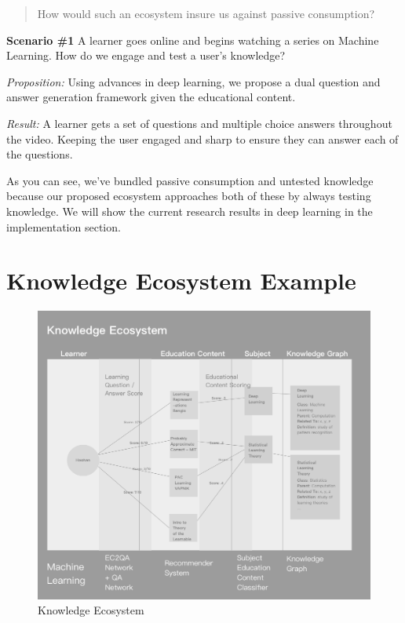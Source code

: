 \documentclass[]{book}
\theoremstyle{definition}
\theoremstyle{definition}
\theoremstyle{definition}
\theoremstyle{remark}
\begin{document}
\begin{quote}
How would such an ecosystem insure us against passive consumption?
\end{quote}

\textbf{Scenario \#1} A learner goes online and begins watching a series
on Machine Learning. How do we engage and test a user's knowledge?

\emph{Proposition:} Using advances in deep learning, we propose a dual
question and answer generation framework given the educational content.

\emph{Result:} A learner gets a set of questions and multiple choice
answers throughout the video. Keeping the user engaged and sharp to
ensure they can answer each of the questions.

As you can see, we've bundled passive consumption and untested knowledge
because our proposed ecosystem approaches both of these by always
testing knowledge. We will show the current research results in deep
learning in the implementation section.

\section{Knowledge Ecosystem Example}\label{knowledge-ecosystem-example}

\begin{figure}
\centering
\includegraphics{img/knowledgeEcosystem.png}
\caption{Knowledge Ecosystem}
\end{figure}
\end{document}
